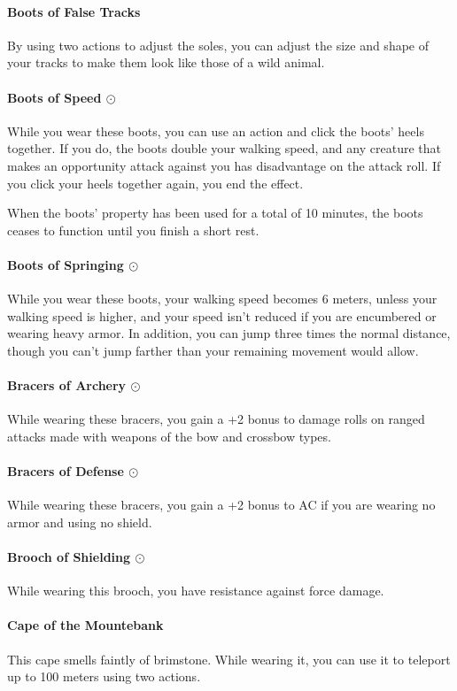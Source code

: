     \paragraph{Boots of False Tracks}
        By using two actions to adjust the soles, you can adjust the size and shape of your tracks to make them look like those of a wild animal.
    \paragraph{Boots of Speed $\odot$}
        While you wear these boots, you can use an action and click the boots' heels together.
        If you do, the boots double your walking speed, and any creature that makes an opportunity attack against you has disadvantage on the attack roll.
        If you click your heels together again, you end the effect.

        When the boots' property has been used for a total of 10 minutes, the boots ceases to function until you finish a short rest.
    \paragraph{Boots of Springing $\odot$}
        While you wear these boots, your walking speed becomes 6 meters, unless your walking speed is higher, and your speed isn't reduced if you are encumbered or wearing heavy armor.
        In addition, you can jump three times the normal distance, though you can't jump farther than your remaining movement would allow.
    \paragraph{Bracers of Archery $\odot$}
        While wearing these bracers, you gain a +2 bonus to damage rolls on ranged attacks made with weapons of the bow and crossbow types.
    \paragraph{Bracers of Defense $\odot$}
        While wearing these bracers, you gain a +2 bonus to AC if you are wearing no armor and using no shield.
    \paragraph{Brooch of Shielding $\odot$}
        While wearing this brooch, you have resistance against force damage.
    \paragraph{Cape of the Mountebank}
        This cape smells faintly of brimstone.
        While wearing it, you can use it to teleport up to 100 meters using two actions.


